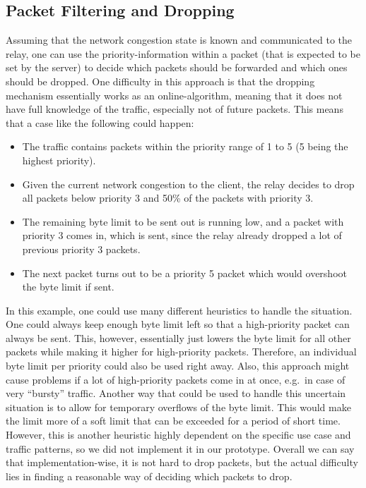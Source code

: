 \subsection{Packet Filtering and Dropping} %
Assuming that the network congestion state is known and communicated to the relay, one can 
use the priority-information within a packet (that is expected to be set by the server) to
decide which packets should be forwarded and which ones should be dropped.
One difficulty in this approach is that the dropping mechanism essentially works as an 
online-algorithm, meaning that it does not have full knowledge of the traffic, especially not of 
future packets.
This means that a case like the following could happen:
\begin{itemize}
    \item The traffic contains packets within the priority range of 1 to 5 (5 being the highest priority).
    \item Given the current network congestion to the client, the relay decides to drop 
            all packets below priority 3 and 50\% of the packets with priority 3.
    \item The remaining byte limit to be sent out is running low, and a packet with priority 3 
            comes in, which is sent, since the relay already dropped a lot of previous priority 3 packets.
    \item The next packet turns out to be a priority 5 packet which would overshoot the byte limit if sent.
\end{itemize}
In this example, one could use many different heuristics to handle the situation.
One could always keep enough byte limit left so that a high-priority packet can always be sent.
This, however, essentially just lowers the byte limit for all other packets while making it higher 
for high-priority packets.
Therefore, an individual byte limit per priority could also be used right away.
Also, this approach might cause problems if a lot of high-priority packets come in at once, 
e.g.~in case of very ``bursty'' traffic.
Another way that could be used to handle this uncertain situation is to allow for temporary 
overflows of the byte limit.
This would make the limit more of a soft limit that can be exceeded for a period of short time.
However, this is another heuristic highly dependent on the specific use case and
traffic patterns, so we did not implement it in our prototype.
Overall we can say that implementation-wise, it is not hard to drop packets, but the actual
difficulty lies in finding a reasonable way of deciding which packets to drop.
